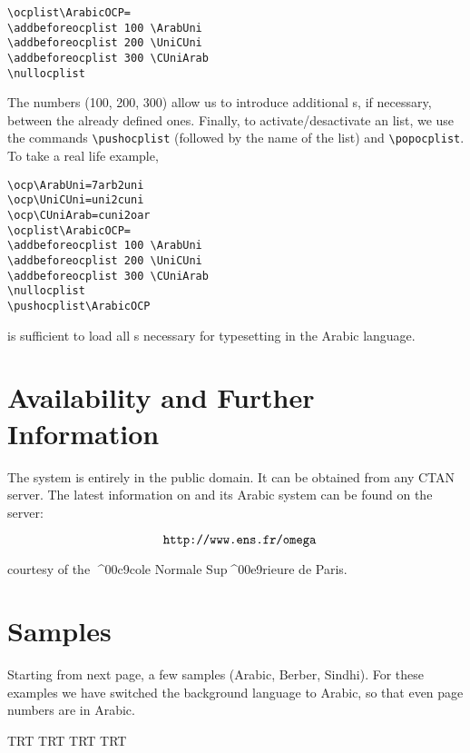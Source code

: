 \documentclass[a4paper,11pt]{article}
\begin{document}
\begin{verbatim}
\ocplist\ArabicOCP=
\addbeforeocplist 100 \ArabUni
\addbeforeocplist 200 \UniCUni
\addbeforeocplist 300 \CUniArab
\nullocplist
\end{verbatim}

The numbers (100, 200, 300) allow us to introduce additional \OTP{}s,
if necessary, between the already defined ones.  Finally, to
activate/desactivate an \OTP{} list, we use the commands
\verb=\pushocplist= (followed by the name of the \OTP{} list) and
\verb=\popocplist=. To take a real life example,

\begin{verbatim}
\ocp\ArabUni=7arb2uni
\ocp\UniCUni=uni2cuni
\ocp\CUniArab=cuni2oar
\ocplist\ArabicOCP=
\addbeforeocplist 100 \ArabUni
\addbeforeocplist 200 \UniCUni
\addbeforeocplist 300 \CUniArab
\nullocplist
\pushocplist\ArabicOCP
\end{verbatim}

\noindent is sufficient to load all \OTP{}s necessary for typesetting
in the Arabic language.

\section{Availability and Further Information}

The \OMEGA{} system is entirely in the public domain. It can be
obtained from any CTAN server. The latest information on \OMEGA{} and
its Arabic system can be found on the \OMEGA{} server:

$$\text{\texttt{http://www.ens.fr/omega}}$$

\noindent courtesy of the ^^^^00c9cole Normale Sup^^^^00e9rieure de
Paris.

\section{Samples}

Starting from next page, a few samples (Arabic, Berber, Sindhi). For
these examples we have switched the background language to Arabic, so
that even page numbers are in Arabic.

\newpage
\makeatletter
\def\@evenfoot{\reset@font\hfil{\textdir TLT\thepage}\hfil}
\let\@oddfoot=\@evenfoot
\makeatother
\pagedir TRT
\bodydir TRT
\pardir TRT
\textdir TRT
\def\latinit#1{{\fontfamily{omlgc}\selectfont\pushocplist\BasicLatinOCP%
\textdir TLT #1\popocplist}}
\def\rmdefault{omarb}
\selectfont
\pushocplist\ArabicOCP
\end{document}
